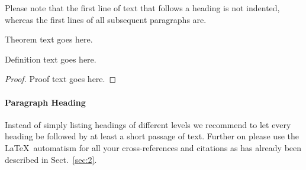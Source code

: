 \documentclass[graybox]{svmult}
\begin{document}
Please note that the first line of text that follows a heading is not indented, whereas the first lines of all subsequent paragraphs are.

\begin{theorem}
Theorem text goes here.
\end{theorem}
%
%
\begin{definition}
Definition text goes here.
\end{definition}

\begin{proof}
Proof text goes here.
\end{proof}

\paragraph{Paragraph Heading} %
Instead of simply listing headings of different levels we recommend to let every heading be followed by at least a short passage of text.  Further on please use the \LaTeX\ automatism for all your cross-references and citations as has already been described in Sect.~\ref{sec:2}.
\end{document}
